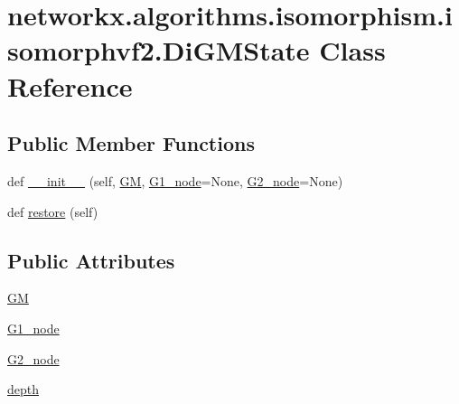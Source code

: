 \hypertarget{classnetworkx_1_1algorithms_1_1isomorphism_1_1isomorphvf2_1_1DiGMState}{}\section{networkx.\+algorithms.\+isomorphism.\+isomorphvf2.\+Di\+G\+M\+State Class Reference}
\label{classnetworkx_1_1algorithms_1_1isomorphism_1_1isomorphvf2_1_1DiGMState}
\subsection*{Public Member Functions}
\begin{DoxyCompactItemize}
\item 
def \hyperlink{classnetworkx_1_1algorithms_1_1isomorphism_1_1isomorphvf2_1_1DiGMState_a781e3282fdf17863c27aecc06f56b270}{\+\_\+\+\_\+init\+\_\+\+\_\+} (self, \hyperlink{classnetworkx_1_1algorithms_1_1isomorphism_1_1isomorphvf2_1_1DiGMState_af2da4f3bcee6582853f2e5e5a71f2bc3}{GM}, \hyperlink{classnetworkx_1_1algorithms_1_1isomorphism_1_1isomorphvf2_1_1DiGMState_a7f327e26ebf4a28321367771d4e9b789}{G1\+\_\+node}=None, \hyperlink{classnetworkx_1_1algorithms_1_1isomorphism_1_1isomorphvf2_1_1DiGMState_af184fd16fa025e95c3db1e9ed81bcb4b}{G2\+\_\+node}=None)
\item 
def \hyperlink{classnetworkx_1_1algorithms_1_1isomorphism_1_1isomorphvf2_1_1DiGMState_ae08d3913cb7891b6bb079ad7dde67b25}{restore} (self)
\end{DoxyCompactItemize}
\subsection*{Public Attributes}
\begin{DoxyCompactItemize}
\item 
\hyperlink{classnetworkx_1_1algorithms_1_1isomorphism_1_1isomorphvf2_1_1DiGMState_af2da4f3bcee6582853f2e5e5a71f2bc3}{GM}
\item 
\hyperlink{classnetworkx_1_1algorithms_1_1isomorphism_1_1isomorphvf2_1_1DiGMState_a7f327e26ebf4a28321367771d4e9b789}{G1\+\_\+node}
\item 
\hyperlink{classnetworkx_1_1algorithms_1_1isomorphism_1_1isomorphvf2_1_1DiGMState_af184fd16fa025e95c3db1e9ed81bcb4b}{G2\+\_\+node}
\item 
\hyperlink{classnetworkx_1_1algorithms_1_1isomorphism_1_1isomorphvf2_1_1DiGMState_a8b16ee2343f8f64b5f25cdf64a575141}{depth}
\end{DoxyCompactItemize}


